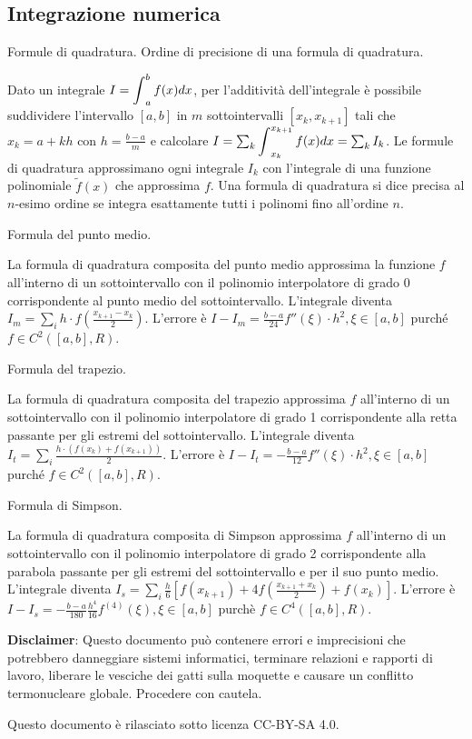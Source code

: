 \documentclass[answers, a4paper]{exam}
\DeclareMathOperator*{\bigint}{\mathop{\mathlarger{\int}}}
\begin{document}
\begin{questions}
\section{Integrazione numerica}
	\question Formule di quadratura. Ordine di precisione di una formula di quadratura.
	\begin{solution}
		Dato un integrale $I = \bigint_a^b f(x) dx$, per l'additività dell'integrale è possibile suddividere l'intervallo $[a, b]$ in $m$ sottointervalli $[x_k, x_{k+1}]$ tali che $x_k = a + kh$ con $h = \frac{b - a}{m}$ e calcolare $I = \sum_k \bigint_{x_k}^{x_{k + 1}} f(x) dx = \sum_k I_k$. 
		Le formule di quadratura approssimano ogni integrale $I_k$ con l'integrale di una funzione polinomiale $\tilde{f}(x)$ che approssima $f$.
		Una formula di quadratura si dice precisa al $n$-esimo ordine se integra esattamente tutti i polinomi fino all'ordine $n$. 
	\end{solution}
	\question Formula del punto medio. 
	\begin{solution}
		La formula di quadratura composita del punto medio approssima la funzione $f$ all'interno di un sottointervallo con il polinomio interpolatore di grado 0 corrispondente al punto medio del sottointervallo. 
		L'integrale diventa $I_m = \sum_i h \cdot f(\frac{x_{k + 1} - x_k}{2})$.
		L'errore è $I - I_m = \frac{b - a}{24} f''(\xi) \cdot h^2, \xi \in [a, b]$ purché $f \in C^2([a, b], R)$.
	\end{solution}
	\question Formula del trapezio.
	\begin{solution}
		La formula di quadratura composita del trapezio approssima $f$ all'interno di un sottointervallo con il polinomio interpolatore di grado 1 corrispondente alla retta passante per gli estremi del sottointervallo.
		L'integrale diventa $I_t = \sum_i \frac{h\cdot(f(x_k) + f(x_{k + 1}))}{2}$.
		L'errore è $I - I_t = - \frac{b - a}{12} f''(\xi) \cdot h^2, \xi \in [a, b]$ purché $f \in C^2([a, b], R)$.
	\end{solution}
	\question Formula di Simpson.
	\begin{solution}
		La formula di quadratura composita di Simpson approssima $f$ all'interno di un sottointervallo con il polinomio interpolatore di grado 2 corrispondente alla parabola passante per gli estremi del sottointervallo e per il suo punto medio.
		L'integrale diventa $I_s = \sum_i \frac{h}{6} [f(x_{k + 1}) + 4 f(\frac{x_{k + 1} + x_k}{2}) + f(x_k)]$.
		L'errore è $I - I_s = -\frac{b - a}{180} \frac{h^4}{16} f^{(4)}(\xi), \xi \in [a, b]$ purchè $f \in C^4([a, b], R)$.
	\end{solution}
\end{questions}
\textbf{Disclaimer}:  Questo documento può contenere errori e imprecisioni che potrebbero danneggiare sistemi informatici, terminare relazioni e rapporti di lavoro, liberare le vesciche dei gatti sulla moquette e causare un conflitto termonucleare globale.
Procedere con cautela.

Questo documento è rilasciato sotto licenza CC-BY-SA 4.0. \faCreativeCommons\ \faCreativeCommonsBy\ \faCreativeCommonsSa
\end{document}
